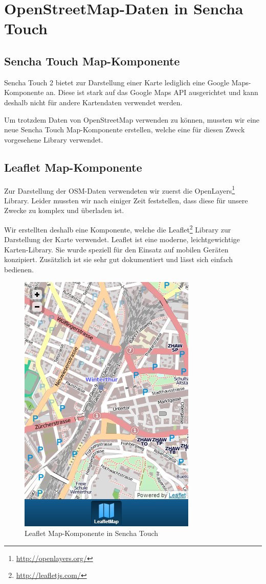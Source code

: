 \chapter{OpenStreetMap-Daten in Sencha Touch}
\label{leaflet-sencha-komponente}

\section{Sencha Touch Map-Komponente}

Sencha Touch 2 bietet zur Darstellung einer Karte lediglich eine Google Maps-Komponente an.
Diese ist stark auf das Google Maps API ausgerichtet und kann deshalb nicht für andere Kartendaten verwendet werden.

Um trotzdem Daten von OpenStreetMap verwenden zu können, mussten wir eine neue Sencha Touch Map-Komponente erstellen, welche eine für diesen Zweck vorgesehene Library verwendet.

\section{Leaflet Map-Komponente}

Zur Darstellung der OSM-Daten verwendeten wir zuerst die OpenLayers\footnote{\url{http://openlayers.org/}} Library.
Leider mussten wir nach einiger Zeit feststellen, dass diese für unsere Zwecke zu komplex und überladen ist.

Wir erstellten deshalb eine Komponente, welche die Leaflet\footnote{\url{http://leafletjs.com/}} Library zur Darstellung der Karte verwendet.
Leaflet ist eine moderne, leichtgewichtige Karten-Library.
Sie wurde speziell für den Einsatz auf mobilen Geräten konzipiert.
Zusätzlich ist sie sehr gut dokumentiert und lässt sich einfach bedienen.

\begin{figure}[H]
	\centering
	\includegraphics[scale=0.5]{images/implementation/frontend/leafletmap-screenshot}
	\caption{Leaflet Map-Komponente in Sencha Touch}
	\label{image-leafletmap-screenshot}
\end{figure}

